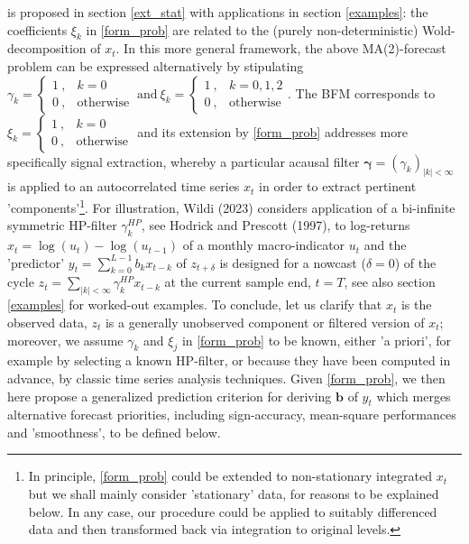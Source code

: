 \documentclass[a4paper]{article}
\begin{document}
is proposed in section \ref{ext_stat} with applications in section \ref{examples}: the coefficients $\xi_k$ in \ref{form_prob} are related to the (purely non-deterministic) Wold-decomposition of $x_t$. In this more general framework, the above MA(2)-forecast problem can be expressed alternatively by stipulating $\gamma_k=\left\{\begin{array}{cc}1~,&k=0\\0~,&\textrm{otherwise}\end{array}\right.~\textrm{and}~\xi_k=\left\{\begin{array}{cc}1~,&k=0,1,2\\0~,&\textrm{otherwise}\end{array}\right.$. The BFM corresponds to $\xi_k=\left\{\begin{array}{cc}1~,&k=0\\0~,&\textrm{otherwise}\end{array}\right.$ and its extension by \ref{form_prob} addresses more specifically signal extraction, whereby a particular acausal filter $\boldsymbol{\gamma}=(\gamma_k)_{|k|<\infty}$ is applied to an  autocorrelated time series $x_t$ in order to extract pertinent 'components'\footnote{In principle, \ref{form_prob} could be extended to non-stationary integrated $x_t$ but we shall mainly consider 'stationary' data, for reasons to be explained below. In any case, our procedure could be applied to suitably differenced data and then transformed back via integration to original levels.}. For illustration, Wildi (2023)  considers application of a bi-infinite symmetric HP-filter $\gamma_k^{HP}$, see Hodrick and Prescott (1997), to log-returns $x_t=\log(u_t)-\log(u_{t-1})$ of a monthly macro-indicator $u_t$ and the 'predictor' $y_t=\sum_{k=0}^{L-1}b_{k}x_{t-k}$ of $z_{t+\delta}$ is designed for a nowcast ($\delta=0$) of the cycle $z_t=\sum_{|k|<\infty}\gamma_k^{HP}x_{t-k}$ at the current sample end, $t=T$, see also section \ref{examples} for worked-out examples. %
To conclude, let us clarify that $x_t$ is the observed data, $z_t$ is a generally unobserved component or filtered version of $x_t$; moreover, we assume $\gamma_k$ and $\xi_j$ in \ref{form_prob} to be known, either 'a priori', for example by selecting a known HP-filter, or because they have been computed in advance, by classic time series analysis techniques. Given \ref{form_prob}, we then here propose a generalized prediction criterion for deriving $\mathbf{b}$ of $y_t$ which merges alternative forecast priorities, including sign-accuracy, mean-square performances and 'smoothness', to be defined below.  
\end{document}
